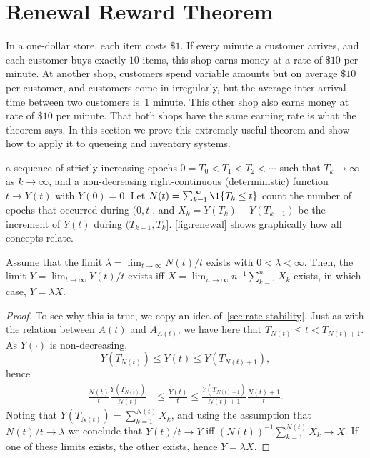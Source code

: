 \documentclass[stochastic-or.tex]{subfiles}
\begin{document}
\section{Renewal Reward Theorem}
\label{sec:renew-reward-theor}

In a one-dollar store, each item costs $\$ 1$.
If every minute a customer arrives, and each customer buys exactly $10$ items, this shop earns money at a rate of $ \$ 10$ per minute.
At another shop, customers spend variable amounts but on average $\$ 10$ per customer, and customers come in irregularly, but the average inter-arrival time between two customers is~$1$ minute.
This other shop also earns money at rate of $\$ 10$ per minute.
That both shops have the same earning rate is what the  theorem says.
In this section we prove this extremely useful theorem and show how to apply it to queueing and inventory systems.


 a sequence of strictly increasing epochs $0=T_0 < T_1 < T_2 < \cdots$ such that $T_k\to\infty$ as $k\to\infty$, and a non-decreasing right-continuous (deterministic) function $t\to Y(t)$ with $Y(0)=0$.
Let $N(t) = \sum_{k=1}^{\infty} \1{T_k\leq t}$ count the number of epochs that occurred during $(0, t]$, and $X_k = Y(T_k)-Y(T_{k-1})$ be the increment of $Y(t)$ during $(T_{k-1}, T_{k}]$.
\cref{fig:renewal} shows graphically how all concepts relate.



\begin{theorem}[Renewal Reward Theorem, $Y=\lambda X$]
Assume  that the limit $\lambda=\lim_{t\to\infty}N(t)/t$ exists with $0<\lambda<\infty$.
Then, the limit $Y=\lim_{t\to\infty}Y(t)/t$ exists iff $X = \lim_{n\to\infty} n^{-1}\sum_{k=1}^{n}X_{k}$ exists, in which
 case, $Y=\lambda X$.
\end{theorem}

\begin{proof}
To see why this is true, we copy an idea of~\cref{sec:rate-stability}. Just as with the relation between $A(t)$ and $A_{A(t)}$, we have here that  $T_{N(t)} \leq t < T_{N(t)+1}$. As $Y(\cdot)$ is non-decreasing,
\begin{equation*}
  Y(T_{N(t)}) \leq Y(t) \leq Y(T_{N(t)+1}),
\end{equation*}
hence
\begin{align*}
\frac{N(t)}{t} \frac{Y(T_{N(t)})}{N(t)}  &\leq \frac{Y(t)} t \leq \frac{Y(T_{N(t)+1})}{N(t)+1} \frac{N(t)+1}{t}.
\end{align*}
Noting that $Y(T_{N(t)}) = \sum_{k=1}^{N(t)} X_{k}$, and using the assumption that $N(t)/t \to \lambda$ we conclude that $Y(t)/t \to Y$ iff $(N(t))^{-1}\sum_{k=1}^{N(t)} X_{k} \to X$.
If one of these limits exists, the other exists, hence $Y=\lambda X$.
\end{proof}
\end{document}
